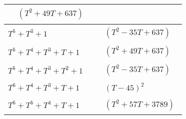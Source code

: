 \begin{tabular}{| l | l |}
$\!\begin{aligned}
	&(T^{2} + 49T + 637)\end{aligned}$ \\
\hline
$T^5 + T^3 + 1$ &
$\!\begin{aligned}
	&(T^{2} - 35T + 637)\end{aligned}$ \\
\hline
$T^5 + T^4 + T^3 + T + 1$ &
$\!\begin{aligned}
	&(T^{2} + 49T + 637)\end{aligned}$ \\
\hline
$T^5 + T^4 + T^3 + T^2 + 1$ &
$\!\begin{aligned}
	&(T^{2} - 35T + 637)\end{aligned}$ \\
\hline
$T^6 + T^4 + T^3 + T + 1$ &
$\!\begin{aligned}
	&(T - 45)^{2}\end{aligned}$ \\
\hline
$T^6 + T^5 + T^4 + T + 1$ &
$\!\begin{aligned}
	&(T^{2} + 57T + 3789)\end{aligned}$ \\
\hline
\end{tabular}


